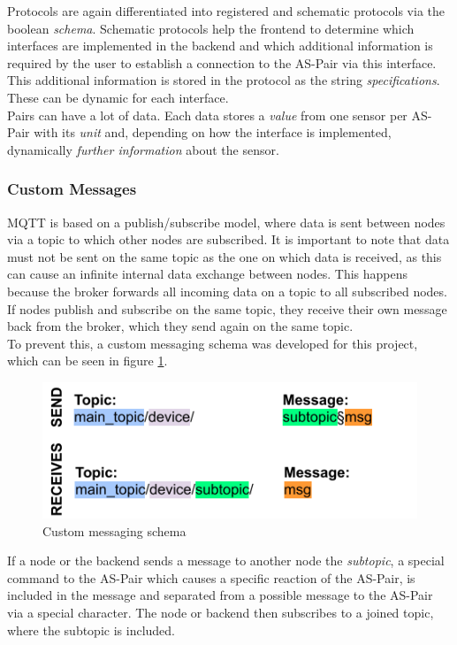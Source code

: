 \newpage

Protocols are again differentiated into registered and schematic protocols via the boolean \textit{schema}. Schematic protocols help the frontend to determine which interfaces are implemented in the backend and which additional information is required by the user to establish a connection to the AS-Pair via this interface. This additional information is stored in the protocol as the string \textit{specifications}. These can be dynamic for each interface.\\

Pairs can have a lot of data. Each data stores a \textit{value} from one sensor per AS-Pair with its \textit{unit} and, depending on how the interface is implemented, dynamically \textit{further information} about the sensor.


\subsubsection{Custom Messages}

MQTT is based on a publish/subscribe model, where data is sent between nodes via a topic to which other nodes are subscribed. It is important to note that data must not be sent on the same topic as the one on which data is received, as this can cause an infinite internal data exchange between nodes. This happens because the broker forwards all incoming data on a topic to all subscribed nodes. If nodes publish and subscribe on the same topic, they receive their own message back from the broker, which they send again on the same topic.\\

To prevent this, a custom messaging schema was developed for this project, which can be seen in figure \ref{fig:custom_msg}.

\begin{figure}[H]
    \centering
    \includegraphics[width=.65\textwidth]{images/4_2/custom_msg.pdf}
    \caption{Custom messaging schema}
    \label{fig:custom_msg}
\end{figure}

If a node or the backend sends a message to another node the \textit{subtopic}, a special command to the AS-Pair which causes a specific reaction of the AS-Pair, is included in the message and separated from a possible message to the AS-Pair via a special character. The node or backend then subscribes to a joined topic, where the subtopic is included.\\

